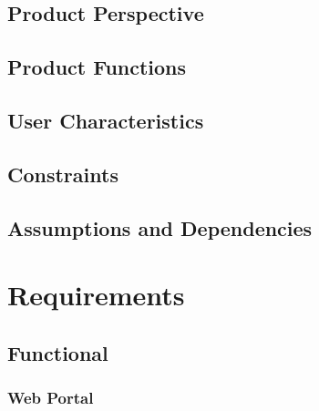 \documentclass[11pt,a4paper]{article}
\begin{document}
\subsection{Product Perspective}
\label{sec:product-perspective}
\subsection{Product Functions}
\label{sec:product-functions}
\subsection{User Characteristics}
\label{sec:user-characteristics}
\subsection{Constraints}
\label{sec:constraints}
\subsection{Assumptions and Dependencies}
\label{sec:assumptions-dependencies}

\section{Requirements}
\label{sec:requirements}
\subsection{Functional}
\label{sec:func-reqs}
\subsubsection{Web Portal}
\label{sec:req-reg-login}
\end{document}
